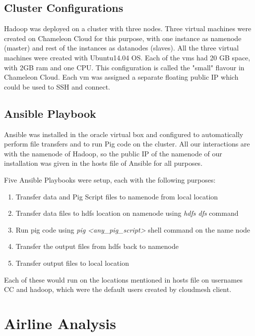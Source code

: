 \documentclass[9pt,twocolumn,twoside]{../../styles/osajnl}
\begin{document}
\subsection{Cluster Configurations}
Hadoop was deployed on a cluster with three nodes. Three virtual machines were created on Chameleon Cloud for this purpose, with one instance as namenode (master) and rest of the instances as datanodes (slaves). All the three virtual machines were created with Ubuntu14.04 OS. Each of the vms had 20 GB space, with 2GB ram and one CPU. This configuration is called the "small" flavour in Chameleon Cloud. Each vm was assigned a separate floating public IP which could be used to SSH and connect. 

\subsection{Ansible Playbook}
Ansible was installed in the oracle virtual box and configured to automatically perform file transfers and to run Pig code on the cluster. All our interactions are with the namenode of  Hadoop, so the public IP of the namenode of our installation was given in the hosts file of Ansible for all purposes. 

Five Ansible Playbooks were setup, each with the following purposes:

\begin{enumerate}
    \item Transfer data and Pig Script files to namenode from local location
    \item Transfer data files to hdfs location on namenode using \textit{hdfs dfs} command
    \item Run pig code using \textit{pig <any\_pig\_script>} shell command on the name node
    \item Transfer the output files from hdfs back to namenode 
    \item Transfer output files to local location
\end{enumerate}

Each of these would run on the locations mentioned in hosts file on usernames CC and hadoop, which were the default users created by cloudmesh client. 


\section{Airline Analysis}
\end{document}
